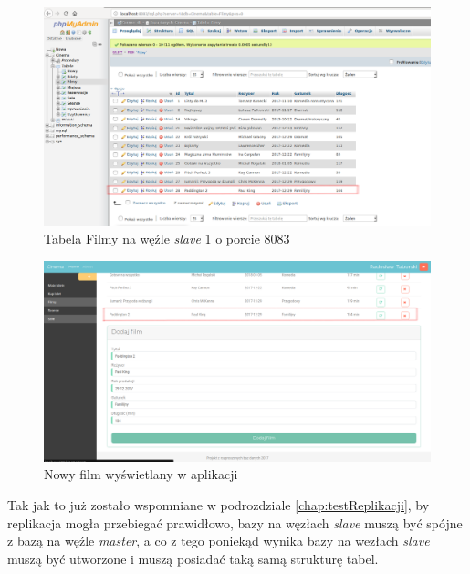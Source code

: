 \begin{figure} [H]
	\centering
	\includegraphics[width=1\linewidth]{rozdzial06/8.png}
	\caption{Tabela Filmy na węźle \textit{slave} 1 o porcie 8083}
	\label{fig:FilmSlave}
\end{figure}

\begin{figure} [H]
	\centering
	\includegraphics[width=1\linewidth]{rozdzial06/6.png}
	\caption{Nowy film wyświetlany w aplikacji}
	\label{fig:endAddFilm}
\end{figure}

Tak jak to już zostało wspomniane w podrozdziale \ref{chap:testReplikacji}, by replikacja mogła przebiegać prawidłowo, bazy na węzłach \textit{slave} muszą być spójne z bazą na węźle \textit{master}, a co z tego poniekąd wynika bazy na wezłach \textit{slave} muszą być utworzone i muszą posiadać taką samą strukturę tabel.

